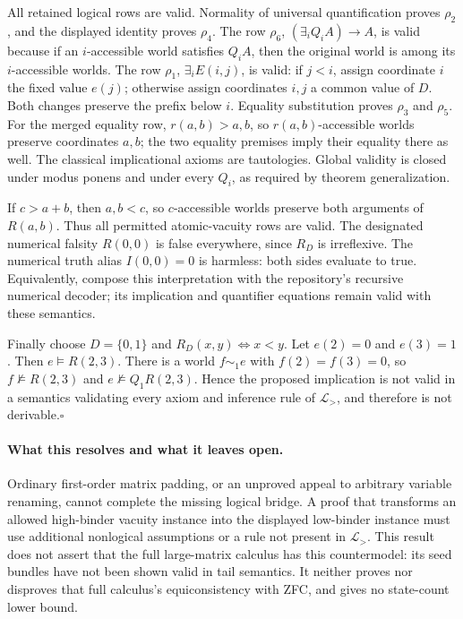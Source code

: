 All retained logical rows are valid. Normality of universal
quantification proves $\rho_2$, and the displayed identity proves
$\rho_4$. The row $\rho_6$, $(\exists_iQ_iA)\to A$, is valid because
if an $i$-accessible world satisfies $Q_iA$, then the original world is
among its $i$-accessible worlds. The row $\rho_1$, $\exists_i E(i,j)$,
is valid: if $j<i$, assign coordinate $i$ the fixed value $e(j)$;
otherwise assign coordinates $i,j$ a common value of $D$. Both changes
preserve the prefix below $i$. Equality substitution proves $\rho_3$
and $\rho_5$. For the merged equality row, $r(a,b)>a,b$, so
$r(a,b)$-accessible worlds preserve coordinates $a,b$; the two equality
premises imply their equality there as well. The classical
implicational axioms are tautologies. Global validity is closed under
modus ponens and under every $Q_i$, as required by theorem
generalization.

If $c>a+b$, then $a,b<c$, so $c$-accessible worlds preserve both
arguments of $R(a,b)$. Thus all permitted atomic-vacuity rows are valid.
The designated numerical falsity $R(0,0)$ is false everywhere, since
$R_D$ is irreflexive. The numerical truth alias $I(0,0)=0$ is harmless:
both sides evaluate to true. Equivalently, compose this interpretation
with the repository's recursive numerical decoder; its implication and
quantifier equations remain valid with these semantics.

Finally choose $D=\{0,1\}$ and $R_D(x,y)\iff x<y$. Let $e(2)=0$
and $e(3)=1$. Then $e\models R(2,3)$. There is a world $f\sim_1 e$
with $f(2)=f(3)=0$, so $f\not\models R(2,3)$ and
$e\not\models Q_1R(2,3)$. Hence the proposed implication is not valid
in a semantics validating every axiom and inference rule of
$\mathcal L_{>}$, and therefore is not derivable.\hfill$\square$

\paragraph{What this resolves and what it leaves open.}
Ordinary first-order matrix padding, or an unproved appeal to arbitrary
variable renaming, cannot complete the missing logical bridge. A proof
that transforms an allowed high-binder vacuity instance into the displayed
low-binder instance must use additional nonlogical assumptions or a rule
not present in $\mathcal L_{>}$. This result does not assert that the
full large-matrix calculus has this countermodel: its seed bundles have
not been shown valid in tail semantics. It neither proves nor disproves
that full calculus's equiconsistency with ZFC, and gives no state-count
lower bound.

